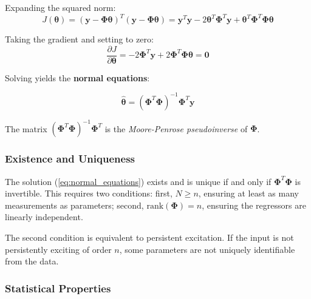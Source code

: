 Expanding the squared norm:
\begin{equation}
J(\boldsymbol{\theta}) = (\mathbf{y} - \boldsymbol{\Phi}\boldsymbol{\theta})^T (\mathbf{y} - \boldsymbol{\Phi}\boldsymbol{\theta}) = \mathbf{y}^T\mathbf{y} - 2\boldsymbol{\theta}^T\boldsymbol{\Phi}^T\mathbf{y} + \boldsymbol{\theta}^T\boldsymbol{\Phi}^T\boldsymbol{\Phi}\boldsymbol{\theta}
\end{equation}

Taking the gradient and setting to zero:
\begin{equation}
\frac{\partial J}{\partial \boldsymbol{\theta}} = -2\boldsymbol{\Phi}^T\mathbf{y} + 2\boldsymbol{\Phi}^T\boldsymbol{\Phi}\boldsymbol{\theta} = \mathbf{0}
\end{equation}

Solving yields the \textbf{normal equations}:

\begin{tcolorbox}[colback=green!5!white,colframe=green!75!black,title=Least Squares Solution,sharp corners]
\begin{equation}
\hat{\boldsymbol{\theta}} = \left(\boldsymbol{\Phi}^T\boldsymbol{\Phi}\right)^{-1}\boldsymbol{\Phi}^T\mathbf{y}
\label{eq:normal_equations}
\end{equation}

The matrix $\left(\boldsymbol{\Phi}^T\boldsymbol{\Phi}\right)^{-1}\boldsymbol{\Phi}^T$ is the \textit{Moore-Penrose pseudoinverse} of $\boldsymbol{\Phi}$.
\end{tcolorbox}

\subsubsection{Existence and Uniqueness}

The solution (\ref{eq:normal_equations}) exists and is unique if and only if $\boldsymbol{\Phi}^T\boldsymbol{\Phi}$ is invertible. This requires two conditions: first, $N \geq n$, ensuring at least as many measurements as parameters; second, $\text{rank}(\boldsymbol{\Phi}) = n$, ensuring the regressors are linearly independent.

The second condition is equivalent to persistent excitation. If the input is not persistently exciting of order $n$, some parameters are not uniquely identifiable from the data.

\subsubsection{Statistical Properties}

